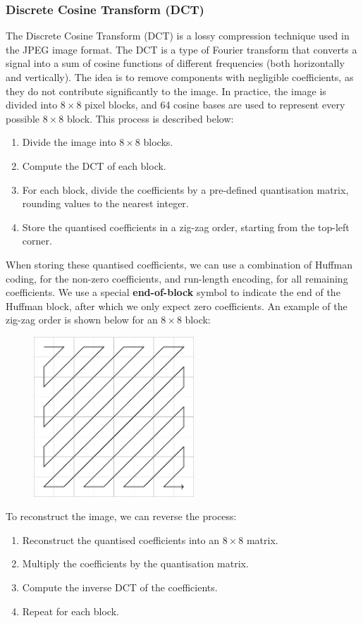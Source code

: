 \documentclass{article}
\begin{document}
\subsubsection{Discrete Cosine Transform (DCT)}
The Discrete Cosine Transform (DCT) is a lossy compression technique
used in the JPEG image format. The DCT is a type of Fourier transform
that converts a signal into a sum of cosine functions of different
frequencies (both horizontally and vertically). The idea is to remove
components with negligible coefficients, as they do not contribute
significantly to the image. In practice, the image is divided into
\(8 \times 8\) pixel blocks, and 64 cosine bases are used to represent
every possible \(8 \times 8\) block. This process is described below:
\begin{enumerate}
    \item Divide the image into \(8 \times 8\) blocks.
    \item Compute the DCT of each block.
    \item For each block, divide the coefficients by a pre-defined
          quantisation matrix, rounding values to the nearest integer.
    \item Store the quantised coefficients in a zig-zag order, starting
          from the top-left corner.
\end{enumerate}
When storing these quantised coefficients, we can use a combination of
Huffman coding, for the non-zero coefficients, and run-length encoding,
for all remaining coefficients. We use a special \textbf{end-of-block}
symbol to indicate the end of the Huffman block, after which we only
expect zero coefficients. An example of the zig-zag order is shown
below for an \(8 \times 8\) block:
\begin{figure}[H]
    \centering
    \includegraphics[height = 6cm]{figures/zig-zag.pdf}
\end{figure}
To reconstruct the image, we can reverse the process:
\begin{enumerate}
    \item Reconstruct the quantised coefficients into an \(8 \times 8\)
          matrix.
    \item Multiply the coefficients by the quantisation matrix.
    \item Compute the inverse DCT of the coefficients.
    \item Repeat for each block.
\end{enumerate}
\end{document}
